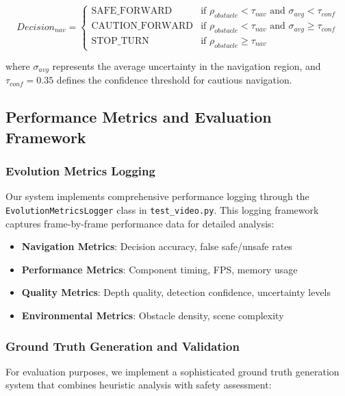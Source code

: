 \documentclass[10pt]{article}
\begin{document}
\begin{equation}
Decision_{nav} = \begin{cases}
\text{SAFE\_FORWARD} & \text{if } \rho_{obstacle} < \tau_{nav} \text{ and } \sigma_{avg} < \tau_{conf} \\
\text{CAUTION\_FORWARD} & \text{if } \rho_{obstacle} < \tau_{nav} \text{ and } \sigma_{avg} \geq \tau_{conf} \\
\text{STOP\_TURN} & \text{if } \rho_{obstacle} \geq \tau_{nav}
\end{cases}
\label{eq:navigation_decision_detailed}
\end{equation}

where $\sigma_{avg}$ represents the average uncertainty in the navigation region, and $\tau_{conf} = 0.35$ defines the confidence threshold for cautious navigation.

\subsection{Performance Metrics and Evaluation Framework}

\subsubsection{Evolution Metrics Logging}

Our system implements comprehensive performance logging through the \texttt{EvolutionMetricsLogger} class in \texttt{test\_video.py}. This logging framework captures frame-by-frame performance data for detailed analysis:

\begin{itemize}
\item \textbf{Navigation Metrics}: Decision accuracy, false safe/unsafe rates
\item \textbf{Performance Metrics}: Component timing, FPS, memory usage
\item \textbf{Quality Metrics}: Depth quality, detection confidence, uncertainty levels
\item \textbf{Environmental Metrics}: Obstacle density, scene complexity
\end{itemize}

\subsubsection{Ground Truth Generation and Validation}

For evaluation purposes, we implement a sophisticated ground truth generation system that combines heuristic analysis with safety assessment:
\end{document}
